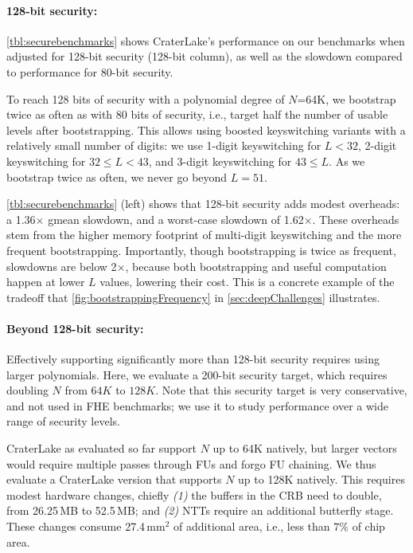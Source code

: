 \paragraph{128-bit security:}
\autoref{tbl:securebenchmarks} shows CraterLake's performance on our benchmarks
when adjusted for 128-bit security (128-bit column), as well as the slowdown
compared to performance for 80-bit security.

\tblSecureBenchmarks

To reach 128 bits of security with a polynomial degree of $N$=64K, we bootstrap
twice as often as with 80 bits of security, i.e., target half the number of
usable levels after bootstrapping. This allows using boosted keyswitching
variants with a relatively small number of digits: we use 1-digit keyswitching
for $L< 32$, 2-digit keyswitching for $32 \leq L< 43$, and 3-digit keyswitching
for $43 \leq L$. As we bootstrap twice as often, we never go beyond $L =51$.

\autoref{tbl:securebenchmarks} (left) shows that 128-bit security adds modest
overheads: a 1.36$\times$ gmean slowdown, and a worst-case slowdown of
1.62$\times$. These overheads stem from the higher memory footprint of
multi-digit keyswitching and the more frequent bootstrapping. Importantly,
though bootstrapping is twice as frequent, slowdowns are below 2$\times$,
because both bootstrapping and useful computation happen at lower $L$ values,
lowering their cost. This is a concrete example of the tradeoff that
\autoref{fig:bootstrappingFrequency} in \autoref{sec:deepChallenges}
illustrates.

\paragraph{Beyond 128-bit security:}
Effectively supporting significantly more than 128-bit security requires using
larger polynomials. Here, we evaluate a 200-bit security target, which requires
doubling $N$ from $64K$ to $128K$. Note that this security target is very
conservative, and not used in FHE benchmarks; we use it to study performance
over a wide range of security levels.

CraterLake as evaluated so far support $N$ up to 64K natively, but larger
vectors would require multiple passes through FUs and forgo FU chaining. We
thus evaluate a CraterLake version that supports $N$ up to 128K natively. This
requires modest hardware changes, chiefly \emph{(1)} the buffers in the CRB
need to double, from 26.25$\,$MB to 52.5$\,$MB; and \emph{(2)} NTTs require an
additional butterfly stage. These changes consume 27.4\,mm$^2$ of additional
area, i.e., less than $7\%$ of chip area.

